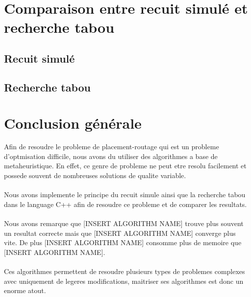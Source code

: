 \section{Comparaison entre recuit simulé et recherche tabou}
\subsection{Recuit simulé}
\newpage
\subsection{Recherche tabou}
\newpage

\section{Conclusion générale}

Afin de resoudre le probleme de placement-routage qui est un probleme d'optmisation difficile, 
nous avons du utiliser des algorithmes a base de metaheuristique. En effet, ce genre de probleme
ne peut etre resolu facilement et possede souvent de nombreuses solutions de qualite variable.\\ \\

Nous avons implemente le principe du recuit simule ainsi que la recherche tabou dans le language
C++ afin de resoudre ce probleme et de comparer les resultats.\\ \\

Nous avons remarque que [INSERT ALGORITHM NAME] trouve plus souvent un resultat correcte mais que 
[INSERT ALGORITHM NAME] converge plus vite.
De plus  [INSERT ALGORITHM NAME] consomme plus de memoire que [INSERT ALGORITHM NAME].\\ \\

Ces algorithmes permettent de resoudre plusieurs types de problemes complexes avec uniquement 
de legeres modifications, maitriser ses algorithmes est donc un enorme atout.

\newpage

